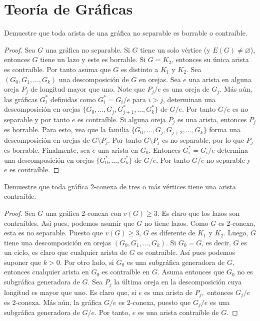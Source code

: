 \documentclass[12pt]{article}
\newenvironment{problem}[2][Problema]{\begin{trivlist}
\item[\hskip \labelsep {\bfseries #1}\hskip \labelsep {\bfseries #2.}]}{\end{trivlist}}
\begin{document}
\section*{Teoría de Gráficas}

\begin{problem}{5.3.2}  Demuestre que toda arista de una gráfica no separable es borrable o contraíble. 
\end{problem}
\begin{proof}
Sea $G$ una gráfica no separable. Si $G$ tiene un solo vértice (y $E(G) \neq \varnothing$), entonces $G$ tiene un lazo y este es borrable. Si $G = K_2$, entonces su única arista es contraíble. Por tanto asuma que $G$ es distinto a $K_1$ y $K_2.$ Sea $(G_0, G_1, \ldots, G_k)$ una descomposición de $G$ en orejas. Sea $e$ una arista en alguna oreja $P_j$ de longitud mayor que uno. Note que  $P_j / e$ es una oreja de $G_j$. Más aún, las gráficas $G_i^\ast$ definidas como $G_i^\ast = G_i / e$ para $i > j$, determinan una descomposición en orejas $\{G_0, \ldots, G_j, G_{j+1}^\ast, \ldots, G_k^\ast \}$ de $G / e$. Por tanto $G/e$ es no separable y por tanto $e$ es contraíble. Si alguna oreja $P_j$ es una arista, entonces $P_j$ es borrable. Para esto, vea que la familia $\{G_0, \ldots, G_j, G_{j+2}, \ldots, G_k \}$ forma una descomposición en orejas de $G \setminus P_j.$ Por tanto $G\setminus P_j$ es no separable, por lo que $P_j$ es borrable. Finalmente, sea $e$ una arista en $G_0$. Entonces $G_i^\ast = G_i / e$ determina una descomposición en orejas $\{G_0^\ast, \ldots, G_k^\ast \}$ de $G / e.$ Por tanto $G / e$ no separable y $e$ es contraíble.
\end{proof}


\begin{problem}{9.1.5} Demuestre que toda gráfica 2-conexa de tres o más vértices tiene una arista contraíble.  
\end{problem}
\begin{proof}
Sea $G$ una gráfica 2-conexa con $v(G) \geq 3.$ Es claro que los lazos son contraíbles. Asi pues, podemos asumir que $G$ no tiene lazos. Como $G$ es 2-conexa, esta es no separable. Puesto que $v(G) \geq 3$, $G$ es diferente de $K_1$ y $K_2$. Luego, $G$ tiene una descomposición en orejas $(G_0, G_1, \ldots, G_k)$. Si $G_0 = G$, es decir, $G$ es un ciclo, es claro que cualquier arista de $G$ es contraíble. Así pues podemos suponer que $k > 0.$ 
Por otro lado, si $G_0$ es una subgráfica generadora de $G$, entonces cualquier arista en $G_0$ es contraíble en $G.$ Asuma entonces que $G_0$ no es subgráfica generadora de $G$. Sea $P_j$ la última oreja en la descomposición cuya longitud es mayor que uno. Es claro que, si $e$ es una arista de $P_j,$ entonces $G_j/e$ es 2-conexa. Más aún, la gráfica $G/e$ es  2-conexa, puesto que $G_j/e$ es una subgráfica generadora de $G/e$. Por tanto, $e$ es una arista contraíble de $G.$
\end{proof}
\end{document}
